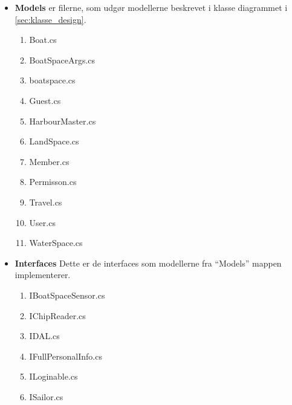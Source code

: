 \begin{itemize}
	\item \textbf{Models} er filerne, som udgør modellerne beskrevet i klasse diagrammet i \cref{sec:klasse_design}.
		\begin{enumerate}
			\item Boat.cs
			\item BoatSpaceArgs.cs
			\item boatspace.cs
			\item Guest.cs
			\item HarbourMaster.cs
			\item LandSpace.cs
			\item Member.cs
			\item Permisson.cs
			\item Travel.cs
			\item User.cs
			\item WaterSpace.cs
		\end{enumerate}
\end{itemize}


\begin{itemize}
	\item \textbf{Interfaces} Dette er de interfaces som modellerne fra \enquote{Models} mappen implementerer.
		\begin{enumerate}
			\item IBoatSpaceSensor.cs
			\item IChipReader.cs
			\item IDAL.cs
			\item IFullPersonalInfo.cs
			\item ILoginable.cs
			\item ISailor.cs
		\end{enumerate}
\end{itemize}

